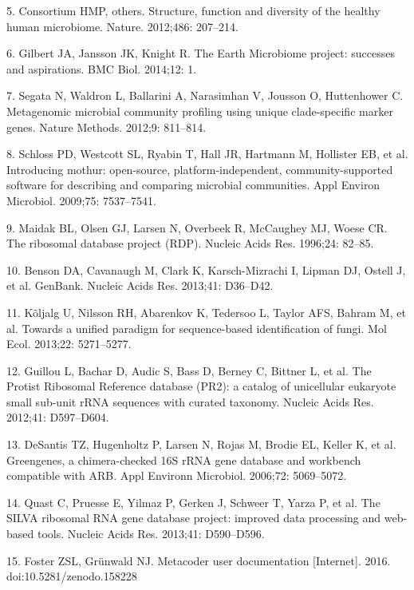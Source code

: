 \documentclass[10pt,letterpaper]{article}
\begin{document}
\label{csl:5}5. Consortium HMP, others. {Structure, function and diversity of the healthy human microbiome}. Nature. 2012;486: 207–214.

\label{csl:6}6. Gilbert JA, Jansson JK, Knight R. {The Earth Microbiome project: successes and aspirations}. BMC Biol. 2014;12: 1.

\label{csl:7}7. Segata N, Waldron L, Ballarini A, Narasimhan V, Jousson O, Huttenhower C. {Metagenomic microbial community profiling using unique clade-specific marker genes}. Nature Methods. 2012;9: 811–814.

\label{csl:8}8. Schloss PD, Westcott SL, Ryabin T, Hall JR, Hartmann M, Hollister EB, et al. {Introducing mothur: open-source, platform-independent, community-supported software for describing and comparing microbial communities}. Appl Environ Microbiol. 2009;75: 7537–7541.

\label{csl:9}9. Maidak BL, Olsen GJ, Larsen N, Overbeek R, McCaughey MJ, Woese CR. {The ribosomal database project (RDP)}. Nucleic Acids Res. 1996;24: 82–85.

\label{csl:10}10. Benson DA, Cavanaugh M, Clark K, Karsch-Mizrachi I, Lipman DJ, Ostell J, et al. {GenBank}. Nucleic Acids Res. 2013;41: D36–D42.

\label{csl:11}11. K{\~o}ljalg U, Nilsson RH, Abarenkov K, Tedersoo L, Taylor AFS, Bahram M, et al. {Towards a unified paradigm for sequence-based identification of fungi}. Mol Ecol. 2013;22: 5271–5277.

\label{csl:12}12. Guillou L, Bachar D, Audic S, Bass D, Berney C, Bittner L, et al. {The Protist Ribosomal Reference database (PR2): a catalog of unicellular eukaryote small sub-unit rRNA sequences with curated taxonomy}. Nucleic Acids Res. 2012;41: D597–D604.

\label{csl:13}13. DeSantis TZ, Hugenholtz P, Larsen N, Rojas M, Brodie EL, Keller K, et al. {Greengenes, a chimera-checked 16S rRNA gene database and workbench compatible with ARB}. Appl Environn Microbiol. 2006;72: 5069–5072.

\label{csl:14}14. Quast C, Pruesse E, Yilmaz P, Gerken J, Schweer T, Yarza P, et al. {The SILVA ribosomal RNA gene database project: improved data processing and web-based tools}. Nucleic Acids Res. 2013;41: D590–D596.

\label{csl:15}15. Foster ZSL, Gr{\"u}nwald NJ. {Metacoder user documentation} [Internet]. 2016. doi:10.5281/zenodo.158228
\end{document}
